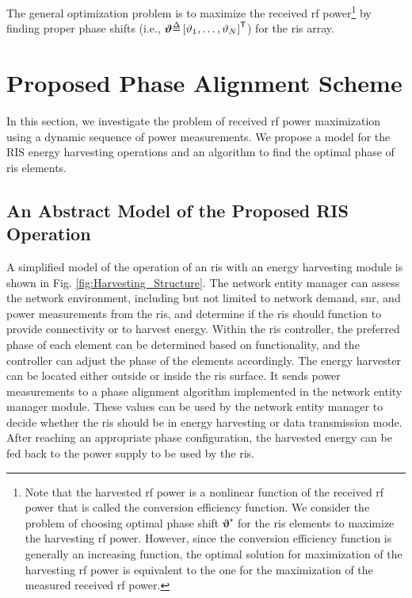 \documentclass[conference]{IEEEtran}
\begin{document}
The general optimization problem is to maximize the received \gls*{rf} power\footnote{Note that the harvested \gls*{rf} power is a nonlinear function of the received \gls*{rf} power that is called the conversion efficiency function. We consider the problem of choosing optimal phase shift $\bm{\vartheta}^{\star}$ for the \gls*{ris} elements to maximize the harvesting \gls*{rf} power. However, since the conversion efficiency function is generally an increasing function, the optimal solution for maximization of the harvesting \gls*{rf} power is equivalent to the one for the maximization of the measured received \gls*{rf} power.} by finding proper phase shifts (i.e.,  $\bm{\vartheta}{\delequal}\left[\vartheta_{1},\dots,\vartheta_{N}\right]^{\mathsf{T}}$) for the \gls*{ris} array. 


\section{Proposed Phase Alignment Scheme}\label{sec:PS}
In this section, we investigate the problem of received \gls*{rf} power maximization using a dynamic sequence of power measurements. We propose a model for the RIS energy harvesting operations and an algorithm to find the optimal phase of \gls*{ris} elements. %


\subsection{An Abstract Model of the Proposed RIS Operation}
A simplified model of the operation of an \gls*{ris} with an energy harvesting module is shown in Fig. \ref{fig:Harvesting_Structure}. The network entity manager can assess the network environment, including but not limited to network demand, \gls*{snr}, and power measurements from the \gls*{ris}, and determine if the \gls*{ris} should function to provide connectivity or to harvest energy. Within the \gls*{ris} controller, the preferred phase of each element can be determined based on functionality, and the controller can adjust the phase of the elements accordingly. The energy harvester can be located either outside or inside the \gls*{ris} surface. It sends power measurements to a phase alignment algorithm implemented in the network entity manager module. These values can be used by the network entity manager to decide whether the \gls*{ris} should be in energy harvesting or data transmission mode. After reaching an appropriate phase configuration, the harvested energy can be fed back to the power supply to be used by the \gls*{ris}.
\end{document}
